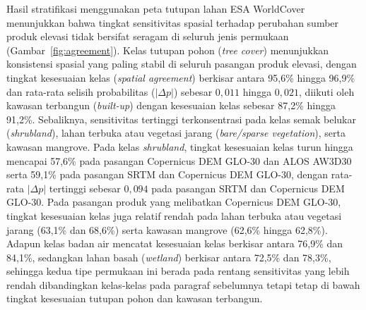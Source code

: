\documentclass[12pt]{article}
\begin{document}
Hasil stratifikasi menggunakan peta tutupan lahan ESA WorldCover menunjukkan
bahwa tingkat sensitivitas spasial terhadap perubahan sumber produk elevasi
tidak bersifat seragam di seluruh jenis permukaan (Gambar~\ref{fig:agreement}).
Kelas tutupan
pohon (\textit{tree cover}) menunjukkan konsistensi spasial yang paling stabil
di seluruh pasangan produk elevasi, dengan tingkat kesesuaian kelas
(\textit{spatial agreement}) berkisar antara 95,6\% hingga 96,9\% dan
rata-rata selisih probabilitas ($|\Delta p|$) sebesar $0{,}011$ hingga
$0{,}021$, diikuti oleh kawasan terbangun (\textit{built-up}) dengan
kesesuaian kelas sebesar 87,2\% hingga 91,2\%. Sebaliknya, sensitivitas
tertinggi terkonsentrasi pada kelas semak belukar (\textit{shrubland}), lahan
terbuka atau vegetasi jarang (\textit{bare/sparse vegetation}), serta kawasan
mangrove. Pada kelas \textit{shrubland}, tingkat kesesuaian kelas turun hingga
mencapai 57,6\% pada pasangan Copernicus DEM GLO-30 dan ALOS AW3D30 serta
59,1\% pada pasangan SRTM dan Copernicus DEM GLO-30, dengan rata-rata
$|\Delta p|$ tertinggi sebesar $0{,}094$ pada pasangan SRTM dan Copernicus DEM
GLO-30. Pada pasangan produk yang melibatkan Copernicus DEM GLO-30, tingkat
kesesuaian kelas juga relatif rendah pada lahan terbuka atau vegetasi jarang
(63,1\% dan 68,6\%) serta kawasan mangrove (62,6\% hingga 62,8\%). Adapun
kelas badan air mencatat kesesuaian kelas berkisar antara 76,9\% dan 84,1\%,
sedangkan lahan basah (\textit{wetland}) berkisar antara 72,5\% dan 78,3\%,
sehingga kedua tipe permukaan ini berada pada rentang sensitivitas yang
lebih rendah dibandingkan kelas-kelas pada paragraf sebelumnya tetapi tetap
di bawah tingkat kesesuaian tutupan pohon dan kawasan terbangun.
\end{document}
